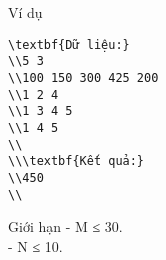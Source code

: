 Ví dụ
\begin{verbatim}
\textbf{Dữ liệu:}
\\5 3
\\100 150 300 425 200
\\1 2 4
\\1 3 4 5
\\1 4 5
\\
\\\textbf{Kết quả:}
\\450
\\\end{verbatim}
Giới hạn
- M ≤ 30.   
\\   - N ≤ 10.